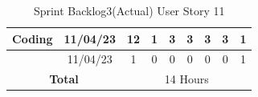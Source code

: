 \documentclass[12pt]{report}
\begin{document}
\begin{table}[h]
{\begin{tabular}{|cc|ccccccc|}
\multicolumn{1}{|c|}{\cellcolor[HTML]{FFFFFF}\textbf{Coding}}                                                     & 11/04/23                                                           & \multicolumn{1}{c|}{\cellcolor[HTML]{FFFFFF}12}                                                                   & \multicolumn{1}{c|}{\cellcolor[HTML]{FFFFFF}1}                                                                  & \multicolumn{1}{c|}{\cellcolor[HTML]{FFFFFF}3}                                                                  & \multicolumn{1}{c|}{\cellcolor[HTML]{FFFFFF}3}                                                                  & \multicolumn{1}{c|}{\cellcolor[HTML]{FFFFFF}3}                                                                  & \multicolumn{1}{c|}{\cellcolor[HTML]{FFFFFF}3}                                                                  & \cellcolor[HTML]{FFFFFF}1                                                                  \\ \hline
\rowcolor[HTML]{FFFFFF} 
\multicolumn{1}{|c|}{\cellcolor[HTML]{FFFFFF}\textbf{Testing}}                                                    & 11/04/23                                                           & \multicolumn{1}{c|}{\cellcolor[HTML]{FFFFFF}1}                                                                    & \multicolumn{1}{c|}{\cellcolor[HTML]{FFFFFF}0}                                                                  & \multicolumn{1}{c|}{\cellcolor[HTML]{FFFFFF}0}                                                                  & \multicolumn{1}{c|}{\cellcolor[HTML]{FFFFFF}0}                                                                  & \multicolumn{1}{c|}{\cellcolor[HTML]{FFFFFF}0}                                                                  & \multicolumn{1}{c|}{\cellcolor[HTML]{FFFFFF}0}                                                                  & \cellcolor[HTML]{FFFFFF}1                                                                  \\ \hline
\multicolumn{2}{|c|}{\textbf{Total}}                                                                                                                                                   & \multicolumn{7}{c|}{14   Hours}                                                                                                                                                                                                                                                                                                                                                                                                                                                                                                                                                                                                                                                                                                                                                                          \\ \hline
\end{tabular}
}
\caption{Sprint Backlog3(Actual) User Story 11}
\label{tab:mytable}
\end{table}
\end{document}
